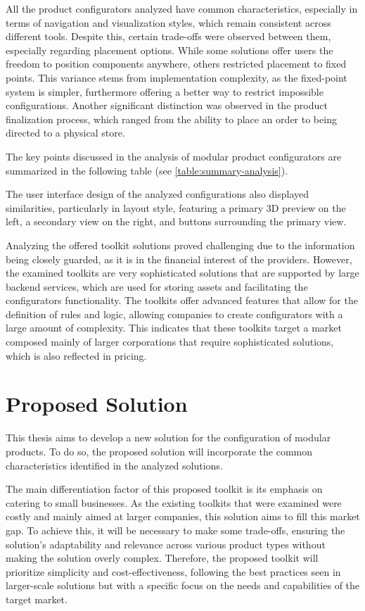 All the product configurators analyzed have common characteristics, especially in terms of navigation and visualization styles, which remain consistent across different tools. Despite this, certain trade-offs were observed between them, especially regarding placement options. While some solutions offer users the freedom to position components anywhere, others restricted placement to fixed points. This variance stems from implementation complexity, as the fixed-point system is simpler, furthermore offering a better way to restrict impossible configurations.
Another significant distinction was observed in the product finalization process, which ranged from the ability to place an order to being directed to a physical store.

The key points discussed in the analysis of modular product configurators are summarized in the following table (see \autoref{table:summary-analysis}).

The user interface design of the analyzed configurations also displayed similarities, particularly in layout style, featuring a primary 3D preview on the left, a secondary view on the right, and buttons surrounding the primary view.

Analyzing the offered toolkit solutions proved challenging due to the information being closely guarded, as it is in the financial interest of the providers. However, the examined toolkits are very sophisticated solutions that are supported by large backend services, which are used for storing assets and facilitating the configurators functionality. The toolkits offer advanced features that allow for the definition of rules and logic, allowing companies to create configurators with a large amount of complexity. This indicates that these toolkits target a market composed mainly of larger corporations that require sophisticated solutions, which is also reflected in pricing.

\section{Proposed Solution}

This thesis aims to develop a new solution for the configuration of modular products. To do so, the proposed solution will incorporate the common characteristics identified in the analyzed solutions. 

The main differentiation factor of this proposed toolkit is its emphasis on catering to small businesses. As the existing toolkits that were examined were costly and mainly aimed at larger companies, this solution aims to fill this market gap. To achieve this, it will be necessary to make some trade-offs, ensuring the solution's adaptability and relevance across various product types without making the solution overly complex. Therefore, the proposed toolkit will prioritize simplicity and cost-effectiveness, following the best practices seen in larger-scale solutions but with a specific focus on the needs and capabilities of the target market.

